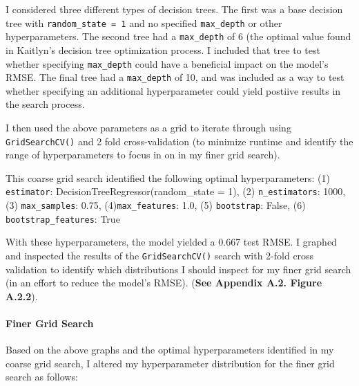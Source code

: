 \documentclass[
  letterpaper,
  DIV=11,
  numbers=noendperiod]{scrartcl}
\let\oldparagraph\paragraph
\renewcommand{\paragraph}[1]{\oldparagraph{#1}\mbox{}}
\begin{document}
I considered three different types of decision trees. The first was a
base decision tree with \texttt{random\_state\ =\ 1} and no specified
\texttt{max\_depth} or other hyperparameters. The second tree had a
\texttt{max\_depth} of 6 (the optimal value found in Kaitlyn's decision
tree optimization process. I included that tree to test whether
specifying \texttt{max\_depth} could have a beneficial impact on the
model's RMSE. The final tree had a \texttt{max\_depth} of 10, and was
included as a way to test whether specifying an additional
hyperparameter could yield postiive results in the search process.

I then used the above parameters as a grid to iterate through using
\texttt{GridSearchCV()} and 2 fold cross-validation (to minimize runtime
and identify the range of hyperparameters to focus in on in my finer
grid search).

This coarse grid search identified the following optimal
hyperparameters: (1) \texttt{estimator}:
DecisionTreeRegressor(random\_state = 1), (2) \texttt{n\_estimators}:
1000, (3) \texttt{max\_samples}: 0.75, (4)\texttt{max\_features}: 1.0,
(5) \texttt{bootstrap}: False, (6) \texttt{bootstrap\_features}: True

With these hyperparameters, the model yielded a 0.667 test RMSE. I
graphed and inspected the results of the \texttt{GridSearchCV()} search
with 2-fold cross validation to identify which distributions I should
inspect for my finer grid search (in an effort to reduce the model's
RMSE). (\textbf{See Appendix A.2. Figure A.2.2}).

\hypertarget{finer-grid-search}{%
\paragraph{Finer Grid Search}\label{finer-grid-search}}

Based on the above graphs and the optimal hyperparameters identified in
my coarse grid search, I altered my hyperparameter distribution for the
finer grid search as follows:
\end{document}
